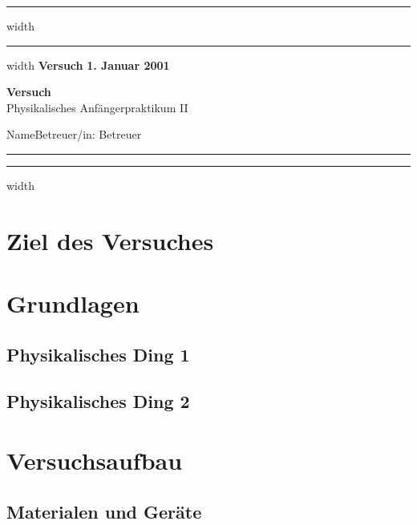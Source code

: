 \documentclass[a4paper,12pt]{article}
\newcounter{Versuch}
\newcommand{\Datum}{\textbf{1. Januar 2001}}        %
\newcommand{\Name}{Name}                            %
\newcommand{\Versuch}{Versuch}                      %
\newcommand{\Betreuer}{Betreuer}                    %
\begin{document}
    \setcounter{Versuch}{1}             %

    
\hrule width\hsize
\vskip 0.1cm    
\hrule width\hsize
\vskip 0.3cm
\noindent
\textbf{Versuch } \hfill  \Datum
\begin{center}
{\textbf{\Versuch}} \\[1ex]
{\small{Physikalisches Anfängerpraktikum II}}
\end{center}
\Name \hfill Betreuer/in: \Betreuer
\vspace{2mm}\hrule
\vskip 0.1cm
\hrule width\hsize
\vspace{3mm}
\vspace{3mm}

\setcounter{tocdepth}{2}
\tableofcontents
\thispagestyle{empty}
\newpage




\section{Ziel des Versuches}
    

    
\section{Grundlagen}

    \subsection{Physikalisches Ding 1}

    \subsection{Physikalisches Ding 2}

\section{Versuchsaufbau}    

    \subsection{Materialen und Geräte}
\end{document}

